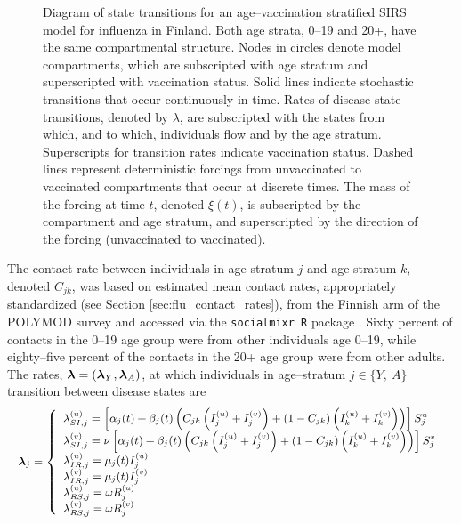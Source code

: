 \begin{figure}[htbp]
	\caption[Diagram of state transitions for an age--vaccination stratified SIRS model for influenza.]{Diagram of state transitions for an age--vaccination stratified SIRS model for influenza in Finland. Both age strata, 0--19 and 20+, have the same compartmental structure. Nodes in circles denote model compartments, which are subscripted with age stratum and superscripted with vaccination status. Solid lines indicate stochastic transitions that occur continuously in time. Rates of disease state transitions, denoted by $ \lambda $, are subscripted with the states from which, and to which, individuals flow and by the age stratum. Superscripts for transition rates indicate vaccination status. Dashed lines represent deterministic forcings from unvaccinated to vaccinated compartments that occur at discrete times. The mass of the forcing at time $ t $, denoted $ \xi(t) $, is subscripted by the compartment and age stratum, and superscripted by the direction of the forcing (unvaccinated to vaccinated).} 
	\label{fig:flu_sirs_diag}
\end{figure}

The contact rate between individuals in age stratum $ j $ and age stratum $ k $, denoted $ C_{jk} $, was based on estimated mean contact rates, appropriately standardized (see Section \ref{sec:flu_contact_rates}), from the Finnish arm of the POLYMOD survey \cite{mossong2008social,polymod} and accessed via the \texttt{socialmixr R} package \cite{funk2018socialmixr}. Sixty percent of contacts in the 0--19 age group were from other individuals age 0--19, while eighty--five percent of the contacts in the 20+ age group were from other adults.  The rates, $ \boldsymbol{\lambda} = (\boldsymbol{\lambda}_{Y},\boldsymbol{\lambda}_{A}) $, at which individuals in age--stratum $ j \in \lbrace Y,\ A\rbrace $ transition between disease states are
\begin{equation}\small
\label{eqn:flu_sirs_rates}
\boldsymbol{\lambda}_{j} = \left\lbrace
\begin{array}{ll}
\lambda_{SI,j}^{(u)} = \left [\alpha_{j}(t) + \beta_{j}(t)\left (C_{jk}\left (I_{j}^{(u)} + I_{j}^{(v)}\right ) + (1-C_{jk})\left (I_{k}^{(u)} + I_{k}^{(v)}\right )\right )\right ]S_{j}^{u} \\ 
\lambda_{SI,j}^{(v)} = \nu\left [\alpha_{j}(t) + \beta_{j}(t)\left (C_{jk}\left (I_{j}^{(u)} + I_{j}^{(v)}\right ) + (1-C_{jk})\left (I_{k}^{(u)} + I_{k}^{(v)}\right )\right )\right ]S_{j}^{v}\\
\lambda_{IR,j}^{(u)} = \mu_{j}(t) I_{j}^{(u)} \\
\lambda_{IR,j}^{(v)} = \mu_{j}(t) I_{j}^{(v)} \\
\lambda_{RS,j}^{(u)} = \omega R_{j}^{(u)} \\
\lambda_{RS,j}^{(v)} = \omega R_{j}^{(v)}
\end{array}
\right .
\end{equation}

